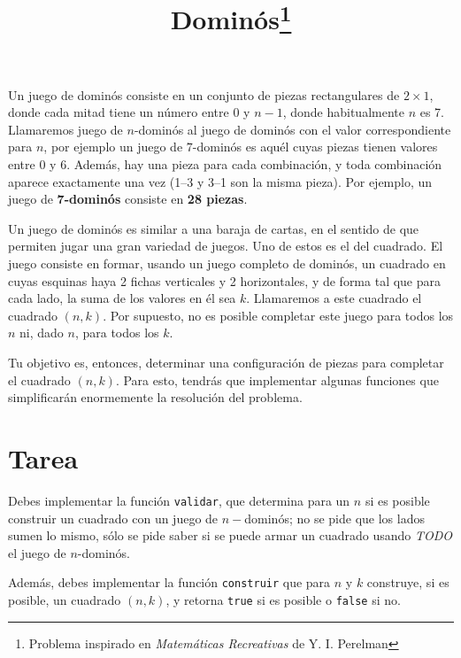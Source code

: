 \documentclass{article}
\title{Dominós\footnote{Problema inspirado en \emph{Matemáticas Recreativas} de Y. I. Perelman}}
\begin{document}
\maketitle

Un juego de dominós consiste en un conjunto de piezas rectangulares de $2\times1$, donde cada mitad tiene un número entre 0 y $n-1$, donde habitualmente $n$ es 7. %
Llamaremos juego de $n$-dominós al juego de dominós con el valor correspondiente para $n$, por ejemplo un juego de $7$-dominós es aquél cuyas piezas tienen valores entre 0 y 6.
Además, hay una pieza para cada combinación, y toda combinación aparece exactamente una vez (1--3 y 3--1 son la misma pieza).
Por ejemplo, un juego de \textbf{7-dominós} consiste en \textbf{28 piezas}.

Un juego de dominós es similar a una baraja de cartas, en el sentido de que permiten jugar una gran variedad de juegos.
Uno de estos es el del cuadrado.
El juego consiste en formar, usando un juego completo de dominós, un cuadrado en cuyas esquinas haya 2 fichas verticales y 2 horizontales, y de forma tal que para cada lado, la suma de los valores en él sea $k$.
Llamaremos a este cuadrado el cuadrado $(n,k)$.
Por supuesto, no es posible completar este juego para todos los $n$ ni, dado $n$, para todos los $k$.

Tu objetivo es, entonces, determinar una configuración de piezas para completar el cuadrado $(n,k)$.
Para esto, tendrás que implementar algunas funciones que simplificarán enormemente la resolución del problema.

\section*{Tarea}

Debes implementar la función \verb+validar+, que determina para un $n$ si es posible construir un cuadrado con un juego de $n-$dominós; no se pide que los lados sumen lo mismo, sólo se pide saber si se puede armar un cuadrado usando \emph{TODO} el juego de $n$-dominós.

Además, debes implementar la función \verb+construir+ que para $n$ y $k$ construye, si es posible, un cuadrado $(n,k)$, y retorna \verb+true+ si es posible o \verb+false+ si no.
\end{document}
